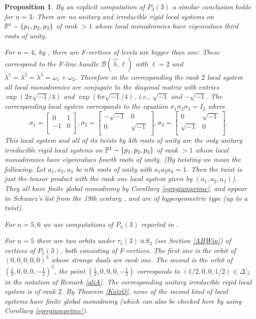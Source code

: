 \documentclass[11pt]{amsart}
\newtheorem{proposition}[theorem]{Proposition}
\numberwithin{theorem}{subsection}
\begin{document}
{\begin{proposition}
By an explicit computation of $P_3(3)$ a similar conclusion holds for $n=3$: There are no unitary and irreducible  rigid local systems on $\Bbb{P}^{1}-\{p_1,p_2,p_3\}$ of rank $>1$ whose local monodromies have eigenvalues third roots of unity.

For $n=4$, by \cite[Section 7]{BLocal}, there are F-vertices of levels are bigger than one: These correspond to the  F-line bundle $\mathcal{B}(\vec{\lambda},\ell)$ with $\ell=2$ and $\lambda^1=\lambda^2=\lambda^3=\omega_1+\omega_3$. Therefore in the corresponding the rank $2$ local system   all local monodromies are conjugate to the diagonal matrix with entries $\exp(2\pi\sqrt{-1}/4)$ and $\exp(6\pi\sqrt{-1}/4)$, i.e., $\sqrt{-1}$ and $-\sqrt{-1}$.  The corresponding local system corresponds to the equation $\sigma_1\sigma_2\sigma_3=I_2$ where
\begin{equation}\label{dfnsigma}
   \sigma_1=
  \left[ {\begin{array}{cc}
   0 & 1 \\
   -1 & 0 \\
  \end{array} }\right],   \sigma_2=
  \left[ {\begin{array}{cc}
   -\sqrt{-1} & 0 \\
   0 & \sqrt{-1} \\
  \end{array} }\right],  \sigma_3=
  \left[ {\begin{array}{cc}
   0 & \sqrt{-1} \\
   \sqrt{-1} & 0 \\
  \end{array} }\right].
  \end{equation}
This local system and all of its twists by $4$th roots of unity  are the only unitary irreducible rigid local systems on $\Bbb{P}^{1}-\{p_1,p_2,p_3\}$ of rank $>1$ whose local monodromies have eigenvalues fourth roots of unity.
(By twisting we mean the following. Let $a_1,a_2,a_3$ be $n$th roots of unity with $a_1a_2a_3=1$.  Then the twist is just the tensor product with the rank one local system given by $(a_1,a_2,a_3)$). They all have finite global monodromy by Corollary \ref{egregiumprime}, and appear in Schwarz's list from the 19th century \cite{Schwarz}, and are of hypergeometric type (up to a twist).

For $n=5,6$ we use computations of $P_n(3)$ reported in \cite{thaddy}.

For $n=5$ there are two orbits under $\tau_5(3)\rtimes S_3$ (see Section \ref{ABWin})  of vertices of $P_5(3)$, both consisting of F-vertices. The first one is the orbit of $(0,0,0,0,0)^3$ whose strange duals are rank one. The second is the orbit of $(\frac{1}{2},0,0,0,-\frac{1}{2})^3$, the point $(\frac{1}{2},0,0,0,-\frac{1}{2})$ corresponds to $(1/2,0,0,1/2)\in\Delta'_5$ in the notation of Remark \ref{aliA}.
The corresponding unitary irreducible rigid local system is of rank $2$. By Theorem \ref{KatzQ}, none of the second kind of local systems have finite global monodromy (which can also be checked here by using Corollary \ref{egregiumprime}).


\end{proposition}}
\end{document}
